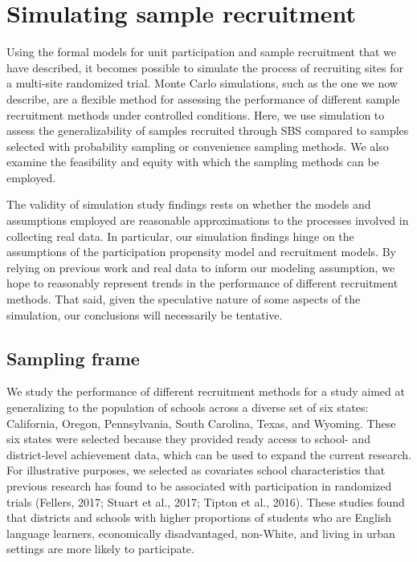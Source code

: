 \documentclass[
  english,
  man,floatsintext]{apa6}
\begin{document}
\hypertarget{simulating-sample-recruitment}{%
\section*{Simulating sample recruitment}\label{simulating-sample-recruitment}}

Using the formal models for unit participation and sample recruitment that we have described, it becomes possible to simulate the process of recruiting sites for a multi-site randomized trial.
Monte Carlo simulations, such as the one we now describe, are a flexible method for assessing the performance of different sample recruitment methods under controlled conditions.
Here, we use simulation to assess the generalizability of samples recruited through SBS compared to samples selected with probability sampling or convenience sampling methods. We also examine the feasibility and equity with which the sampling methods can be employed.

The validity of simulation study findings rests on whether the models and assumptions employed are reasonable approximations to the processes involved in collecting real data. In particular, our simulation findings hinge on the assumptions of the participation propensity model and recruitment models. By relying on previous work and real data to inform our modeling assumption, we hope to reasonably represent trends in the performance of different recruitment methods. That said, given the speculative nature of some aspects of the simulation, our conclusions will necessarily be tentative.

\hypertarget{sampling-frame}{%
\subsection*{Sampling frame}\label{sampling-frame}}

We study the performance of different recruitment methods for a study aimed at generalizing to the population of schools across a diverse set of six states: California, Oregon, Pennsylvania, South Carolina, Texas, and Wyoming. These six states were selected because they provided ready access to school- and district-level achievement data, which can be used to expand the current research.
For illustrative purposes, we selected as covariates school characteristics that previous research has found to be associated with participation in randomized trials (Fellers, 2017; Stuart et al., 2017; Tipton et al., 2016). These studies found that districts and schools with higher proportions of students who are English language learners, economically disadvantaged, non-White, and living in urban settings are more likely to participate.
\end{document}
